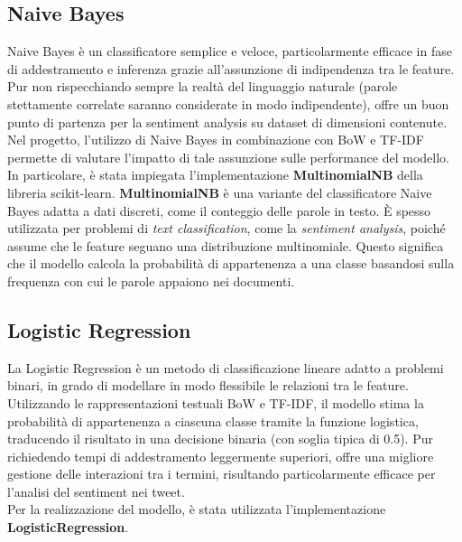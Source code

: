 \documentclass[12pt,a4paper]{report} %
\begin{document}
\subsection{Naive Bayes}
Naive Bayes è un classificatore semplice e veloce, particolarmente efficace in fase di addestramento e inferenza grazie all’assunzione di indipendenza tra le feature. Pur non rispecchiando sempre la realtà del linguaggio naturale (parole stettamente correlate saranno considerate in modo indipendente), offre un buon punto di partenza per la sentiment analysis su dataset di dimensioni contenute. Nel progetto, l’utilizzo di Naive Bayes in combinazione con BoW e TF-IDF permette di valutare l’impatto di tale assunzione sulle performance del modello. \\In particolare, è stata impiegata l’implementazione \textbf{MultinomialNB} della libreria scikit-learn. \textbf{MultinomialNB }è una variante del classificatore Naive Bayes adatta a dati discreti, come il conteggio delle parole in testo. È spesso utilizzata per problemi di \textit{text classification}, come la \textit{sentiment analysis}, poiché assume che le feature seguano una distribuzione multinomiale. Questo significa che il modello calcola la probabilità di appartenenza a una classe basandosi sulla frequenza con cui le parole appaiono nei documenti. 
\subsection{Logistic Regression}
La Logistic Regression è un metodo di classificazione lineare adatto a problemi binari, in grado di modellare in modo flessibile le relazioni tra le feature. Utilizzando le rappresentazioni testuali BoW e TF-IDF, il modello stima la probabilità di appartenenza a ciascuna classe tramite la funzione logistica, traducendo il risultato in una decisione binaria (con soglia tipica di 0.5). Pur richiedendo tempi di addestramento leggermente superiori, offre una migliore gestione delle interazioni tra i termini, risultando particolarmente efficace per l’analisi del sentiment nei tweet. \\Per la realizzazione del modello, è stata utilizzata l’implementazione \textbf{LogisticRegression}. 
\end{document}
